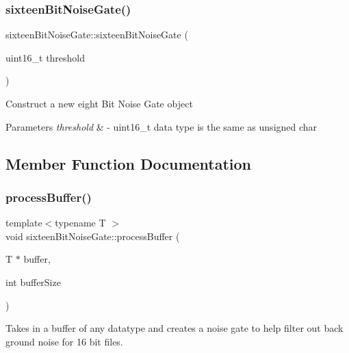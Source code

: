 \subsubsection{\texorpdfstring{sixteen\+Bit\+Noise\+Gate()}{sixteenBitNoiseGate()}}
{\footnotesize\ttfamily sixteen\+Bit\+Noise\+Gate\+::sixteen\+Bit\+Noise\+Gate (\begin{DoxyParamCaption}\item[{uint16\+\_\+t}]{threshold }\end{DoxyParamCaption})}




\begin{DoxyItemize}
\item Construct a new eight Bit Noise Gate object 
\end{DoxyItemize}


\begin{DoxyParams}{Parameters}
{\em threshold} & -\/ uint16\+\_\+t data type is the same as unsigned char \\
\hline
\end{DoxyParams}


\subsection{Member Function Documentation}
\mbox{\label{classsixteenBitNoiseGate_a27bdf787a56e96e7b6ff3f2edd86ca82}} 
\subsubsection{\texorpdfstring{process\+Buffer()}{processBuffer()}}
{\footnotesize\ttfamily template$<$typename T $>$ \\
void sixteen\+Bit\+Noise\+Gate\+::process\+Buffer (\begin{DoxyParamCaption}\item[{T $\ast$}]{buffer,  }\item[{int}]{buffer\+Size }\end{DoxyParamCaption})\hspace{0.3cm}{\ttfamily [inline]}}



Takes in a buffer of any datatype and creates a noise gate to help filter out back ground noise for 16 bit files. 


